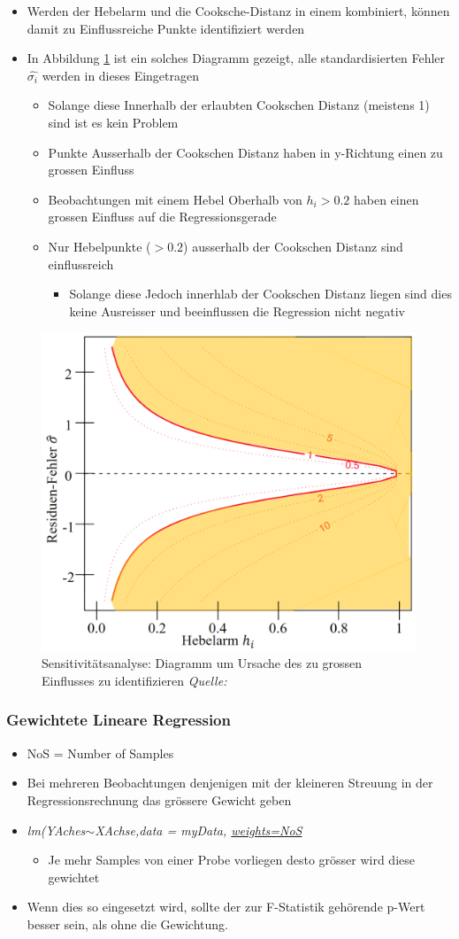 \begin{itemize}
	\item Werden der Hebelarm und die Cooksche-Distanz in einem kombiniert, können damit zu Einflussreiche Punkte identifiziert werden
	\item In Abbildung \ref{fig:sensitivitaet} ist ein solches Diagramm gezeigt, alle standardisierten Fehler $\hat{\sigma_i}$ werden in dieses Eingetragen
	\begin{itemize}
		\item Solange diese Innerhalb der erlaubten Cookschen Distanz (meistens 1) sind ist es kein Problem
		\item Punkte Ausserhalb der Cookschen Distanz haben in y-Richtung einen zu grossen Einfluss
		\item Beobachtungen mit einem Hebel Oberhalb von $h_i>0.2$ haben einen grossen Einfluss auf die Regressionsgerade
		\item Nur Hebelpunkte ($>0.2$) ausserhalb der Cookschen Distanz sind einflussreich
		\begin{itemize}
			\item Solange diese Jedoch innerhlab der Cookschen Distanz liegen sind dies keine Ausreisser und beeinflussen die Regression nicht negativ
		\end{itemize}
	\end{itemize}
\end{itemize}

\begin{figure}[h!]
	\centering
	\includegraphics[width=0.3\linewidth]{figures/Sensitivitaet}
	\caption{Sensitivitätsanalyse: Diagramm um Ursache des zu grossen Einflusses zu identifizieren \textit{Quelle: }\cite{C:Cook}}
	\label{fig:sensitivitaet}
\end{figure}

\subsubsection{Gewichtete Lineare Regression}
\begin{itemize}
	\item NoS = Number of Samples
	\item Bei mehreren Beobachtungen denjenigen mit der kleineren Streuung in der Regressionsrechnung das grössere Gewicht geben
	\item \textit{lm(YAches$\sim$XAchse,data = myData, \underline{weights=NoS}}
	\begin{itemize}
		\item Je mehr Samples von einer Probe vorliegen desto grösser wird diese gewichtet
	\end{itemize}
	\item Wenn dies so eingesetzt wird, sollte der zur F-Statistik gehörende p-Wert besser sein, als ohne die Gewichtung.
\end{itemize}

